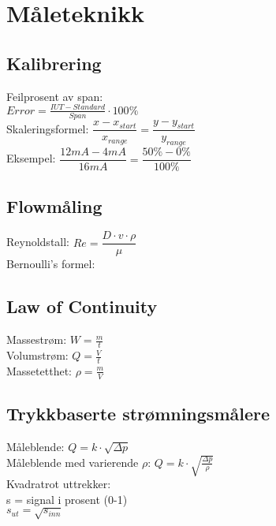 \section{Måleteknikk}
\subsection*{Kalibrering}
Feilprosent av span:\\
$Error=\frac {IUT-Standard}{Span} \cdot 100\% $\\
\vskip 2.5pt 
Skaleringsformel:
\vskip 2.5pt 
$\dfrac{x-x_{start}}{x_{range}}=\dfrac{y-y_{start}}{y_{range}}$\\
Eksempel: $\dfrac{12mA-4mA}{16mA}=\dfrac{50\%-0\%}{100\%}$
\subsection*{Flowmåling}
\vskip 2.5pt 
\vskip 2.5pt 
\vskip 2.5pt 
Reynoldstall: $Re=\dfrac {D \cdot v \cdot \rho}{\mu}$\\
\vskip 2.5pt 
Bernoulli's formel:\\
\vskip 2.5pt 
\subsection*{Law of Continuity}
%
Massestrøm: $W=\frac{m}{t}$\\
\vskip 2.5pt 
Volumstrøm: $Q=\frac{V}{t}$\\
\vskip 2.5pt 
Massetetthet: $\rho=\frac{m}{V}$\\
\vskip 2.5pt 
\subsection*{Trykkbaserte strømningsmålere}
Måleblende: $Q=k\cdot \sqrt{\Delta p}$\\
\vskip 2.5pt 
Måleblende med varierende $\rho$: $Q=k\cdot \sqrt{\frac{\Delta p}{\rho}}$\\
\vskip 2.5pt
Kvadratrot uttrekker:\\
s = signal i prosent (0-1)\\
$s_{ut}=\sqrt{s_{inn}}$\\
